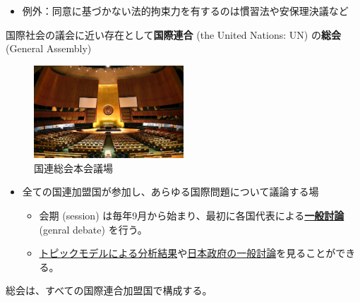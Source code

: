 \documentclass[
  xelatex,
  ja=standard]{bxjsarticle}
\providecommand{\tightlist}{%
  \setlength{\itemsep}{0pt}\setlength{\parskip}{0pt}}\usepackage{longtable,booktabs,array}
\begin{document}
\begin{itemize}
\tightlist
\item
  例外：同意に基づかない法的拘束力を有するのは慣習法や安保理決議など
\end{itemize}

国際社会の議会に近い存在として\textbf{国際連合} (the United Nations: UN)
の\textbf{総会} (General Assembly)

\begin{figure}[htpb]

{\centering \includegraphics[width=0.5\textwidth,height=\textheight]{international_society_files/mediabag/1280px-UN_General_As.jpg}

}

\caption{国連総会本会議場}

\end{figure}

\begin{itemize}
\tightlist
\item
  全ての国連加盟国が参加し、あらゆる国際問題について議論する場

  \begin{itemize}
  \tightlist
  \item
    会期 (session)
    は毎年9月から始まり、最初に各国代表による\href{https://gadebate.un.org/}{\textbf{一般討論}}
    (genral debate) を行う。
  \item
    \href{http://ungd.smikhaylov.net/}{トピックモデルによる分析結果}や\href{https://www.mofa.go.jp/mofaj/gaiko/unsokai/toron.html}{日本政府の一般討論}を見ることができる。
  \end{itemize}
\end{itemize}

\begin{tcolorbox}[enhanced jigsaw, colbacktitle=quarto-callout-note-color!10!white, colframe=quarto-callout-note-color-frame, arc=.35mm, rightrule=.15mm, bottomtitle=1mm, bottomrule=.15mm, breakable, coltitle=black, left=2mm, opacitybacktitle=0.6, title=\textcolor{quarto-callout-note-color}{\faInfo}\hspace{0.5em}{\href{https://www.unic.or.jp/info/un/charter/text_japanese/}{国連憲章}　第9条1項}, colback=white, toptitle=1mm, titlerule=0mm, toprule=.15mm, leftrule=.75mm, opacityback=0]

総会は、すべての国際連合加盟国で構成する。

\end{tcolorbox}
\end{document}
